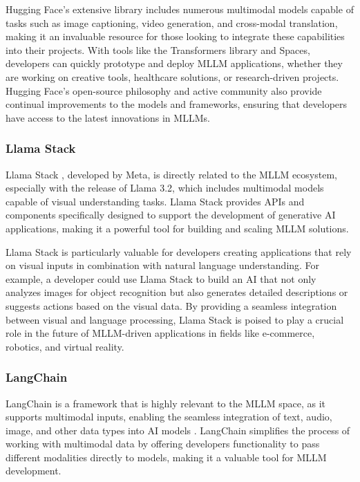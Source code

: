 Hugging Face's extensive library includes numerous multimodal models capable of tasks such as image captioning, video generation, and cross-modal translation, making it an invaluable resource for those looking to integrate these capabilities into their projects. 
With tools like the Transformers library and Spaces, developers can quickly prototype and deploy MLLM applications, whether they are working on creative tools, healthcare solutions, or research-driven projects. 
Hugging Face's open-source philosophy and active community also provide continual improvements to the models and frameworks, ensuring that developers have access to the latest innovations in MLLMs.

\subsubsection{Llama Stack}

Llama Stack \cite{wu2024llama}, developed by Meta, is directly related to the MLLM ecosystem, especially with the release of Llama 3.2, which includes multimodal models capable of visual understanding tasks. 
Llama Stack provides APIs and components specifically designed to support the development of generative AI applications, making it a powerful tool for building and scaling MLLM solutions.

Llama Stack is particularly valuable for developers creating applications that rely on visual inputs in combination with natural language understanding. 
For example, a developer could use Llama Stack to build an AI that not only analyzes images for object recognition but also generates detailed descriptions or suggests actions based on the visual data. 
By providing a seamless integration between visual and language processing, Llama Stack is poised to play a crucial role in the future of MLLM-driven applications in fields like e-commerce, robotics, and virtual reality.

\subsubsection{LangChain}

LangChain is a framework that is highly relevant to the MLLM space, as it supports multimodal inputs, enabling the seamless integration of text, audio, image, and other data types into AI models \cite{chase2022langchain}. 
LangChain simplifies the process of working with multimodal data by offering developers functionality to pass different modalities directly to models, making it a valuable tool for MLLM development.

